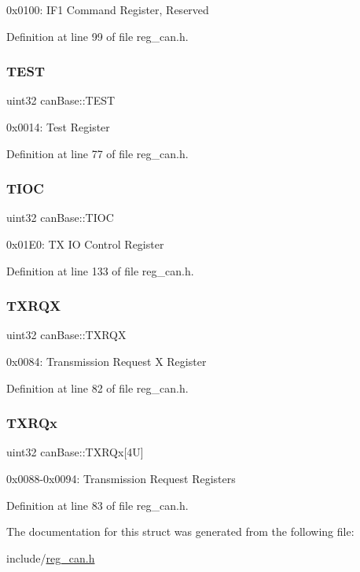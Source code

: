 0x0100\+: I\+F1 Command Register, Reserved 

Definition at line 99 of file reg\+\_\+can.\+h.

\mbox{\label{structcanBase_a4ac3103137aec39b89a353785f0f26af}} 
\subsubsection{\texorpdfstring{T\+E\+ST}{TEST}}
{\footnotesize\ttfamily uint32 can\+Base\+::\+T\+E\+ST}

0x0014\+: Test Register 

Definition at line 77 of file reg\+\_\+can.\+h.

\mbox{\label{structcanBase_a31ab7573f66e259c4ad5b515817e0bdb}} 
\subsubsection{\texorpdfstring{T\+I\+OC}{TIOC}}
{\footnotesize\ttfamily uint32 can\+Base\+::\+T\+I\+OC}

0x01\+E0\+: TX IO Control Register 

Definition at line 133 of file reg\+\_\+can.\+h.

\mbox{\label{structcanBase_a698a4f1bfb7f04bb23aa4105d42d6f65}} 
\subsubsection{\texorpdfstring{T\+X\+R\+QX}{TXRQX}}
{\footnotesize\ttfamily uint32 can\+Base\+::\+T\+X\+R\+QX}

0x0084\+: Transmission Request X Register 

Definition at line 82 of file reg\+\_\+can.\+h.

\mbox{\label{structcanBase_aa8046a659a6d6d5a1d732f8a99a08e65}} 
\subsubsection{\texorpdfstring{T\+X\+R\+Qx}{TXRQx}}
{\footnotesize\ttfamily uint32 can\+Base\+::\+T\+X\+R\+Qx\mbox{[}4\+U\mbox{]}}

0x0088-\/0x0094\+: Transmission Request Registers 

Definition at line 83 of file reg\+\_\+can.\+h.



The documentation for this struct was generated from the following file\+:\begin{DoxyCompactItemize}
\item 
include/\mbox{\hyperlink{reg__can_8h}{reg\+\_\+can.\+h}}\end{DoxyCompactItemize}
